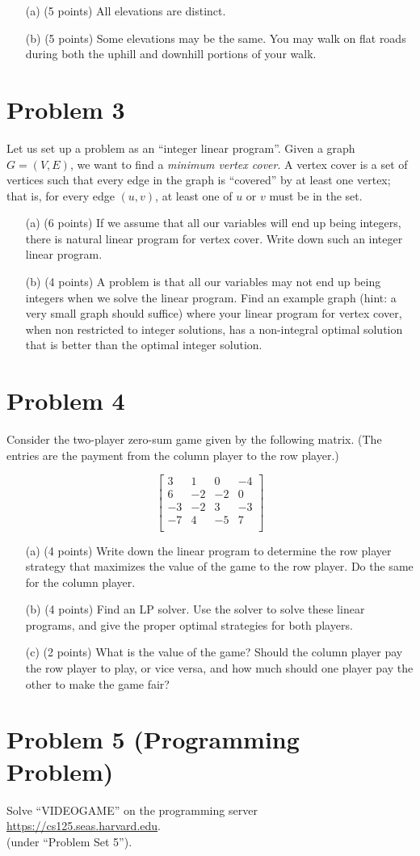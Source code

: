 \documentclass[12pt]{article}
\begin{document}
\begin{itemize}
\item[(a)] (5 points) All elevations are distinct.
\item[(b)] (5 points) Some elevations may be the same. You may walk on flat roads during both the uphill and downhill portions of your walk.
\end{itemize}

\section*{Problem 3}

Let us set up a problem as an ``integer linear program''.  Given a graph $G =(V,E)$, we want to find a {\em minimum vertex cover}.  A vertex cover is a set of vertices such that every edge in the graph is ``covered'' by at least one vertex;  that is, for every edge $(u,v)$, at least one of $u$ or $v$ must be in the set.
\begin{itemize}
\item[(a)] (6 points) If we assume that all our variables will end up being integers, there is natural linear program for vertex cover.  Write down such an integer linear program.
\item[(b)] (4 points) A problem is that all our variables may not end up being integers when we solve the linear program.  Find an example graph (hint:  a very small graph should suffice) where your linear program for vertex cover, when non restricted to integer solutions, has a non-integral optimal solution that is better than the optimal integer solution.
\end{itemize}

\section*{Problem 4}

Consider the two-player zero-sum game given by the following matrix.  (The entries are the payment from the column player to the row player.)

$$\left[\begin{array}{cccc}
3 & 1 & 0 & -4  \\
6 & -2 & -2 & 0 \\
-3 & -2 & 3 & -3 \\
-7 & 4 & -5 & 7 \\
\end{array}
\right]
$$
\begin{itemize}
\item[(a)] (4 points) Write down the linear program to determine the row player strategy that maximizes the value of the game to the row player. Do the same for the column player.
\item[(b)] (4 points) Find an LP solver.  Use the solver to solve these linear programs, and give the proper optimal strategies for both players.
\item[(c)] (2 points) What is the value of the game?  Should the column player pay the row player to play, or vice versa, and how much should one player pay the other to make the game fair?
\end{itemize}

\section*{Problem 5 (Programming Problem)}
Solve ``VIDEOGAME'' on the programming server \url{https://cs125.seas.harvard.edu}.\\
(under ``Problem Set 5'').
\end{document}
